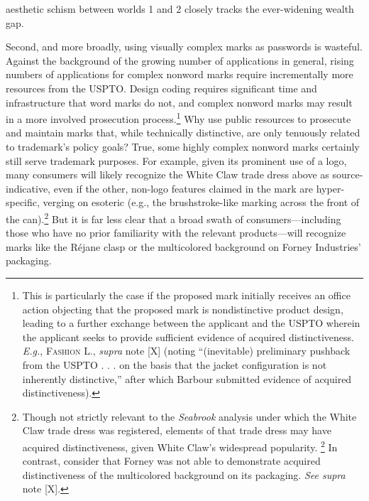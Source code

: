 \documentclass[letterpaper, 11pt, oneside]{article}
\begin{document}
aesthetic schism between worlds 1 and 2 closely tracks the ever-widening wealth gap.

Second, and more broadly, using visually complex marks as passwords is wasteful. Against the background of the growing number of applications in general, rising numbers of applications for complex nonword marks require incrementally more resources from the USPTO. Design coding requires significant time and infrastructure that word marks do not, and complex nonword marks may result in a more involved prosecution process.\footnote{This is particularly the case if the proposed mark initially receives an office action objecting that the proposed mark is nondistinctive product design, leading to a further exchange between the applicant and the USPTO wherein the applicant seeks to provide sufficient evidence of acquired distinctiveness. \textit{E.g.}, \textsc{Fashion L.}, \textit{supra} note [X] (noting ``(inevitable) preliminary pushback from the USPTO . . . on the basis that the jacket configuration is not inherently distinctive,'' after which Barbour submitted evidence of acquired distinctiveness).} Why use public resources to prosecute and maintain marks that, while technically distinctive, are only tenuously related to trademark's policy goals? True, some highly complex nonword marks certainly still serve trademark purposes. For example, given its prominent use of a logo, many consumers will likely recognize the White Claw trade dress above as source-indicative, even if the other, non-logo features claimed in the mark are hyper-specific, verging on esoteric (e.g., the brushstroke-like marking across the front of the can).\footnote{Though not strictly relevant to the \textit{Seabrook} analysis under which the White Claw trade dress was registered, elements of that trade dress may have acquired distinctiveness, given White Claw's widespread popularity. \footnote{Jonah E. Bromwich, \textit{The Memes Are Pouring the White Claw Down Your Throat!}, \textsc{N.Y. Times} (Sept. 5, 2019), \url{https://www.nytimes.com/2019/09/05/style/white-claw-popular-memes.html}.} In contrast, consider that Forney was not able to demonstrate acquired distinctiveness of the multicolored background on its packaging. \textit{See supra} note [X].} But it is far less clear that a broad swath of consumers—including those who have no prior familiarity with the relevant products—will recognize marks like the Réjane clasp or the multicolored background on Forney Industries' packaging.
\end{document}
